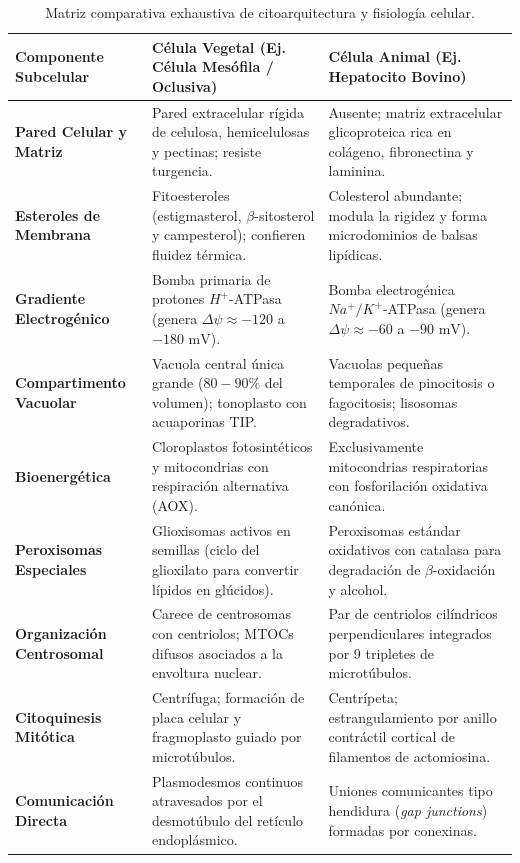 \documentclass[12pt,spanish,letterpaper,oneside]{article}
\begin{document}
\begin{table}[h!]
\centering
\footnotesize
\begin{tabularx}{\textwidth}{lYY}
\toprule
\textbf{Componente Subcelular} & \textbf{Célula Vegetal (Ej. Célula Mesófila / Oclusiva)} & \textbf{Célula Animal (Ej. Hepatocito Bovino)} \\
\midrule
\textbf{Pared Celular y Matriz} & Pared extracelular rígida de celulosa, hemicelulosas y pectinas; resiste turgencia. & Ausente; matriz extracelular glicoproteica rica en colágeno, fibronectina y laminina. \\
\textbf{Esteroles de Membrana} & Fitoesteroles (estigmasterol, $\beta$-sitosterol y campesterol); confieren fluidez térmica. & Colesterol abundante; modula la rigidez y forma microdominios de balsas lipídicas. \\
\textbf{Gradiente Electrogénico} & Bomba primaria de protones $H^+$-ATPasa (genera $\Delta\psi \approx -120$ a $-180\text{ mV}$). & Bomba electrogénica $Na^+/K^+$-ATPasa (genera $\Delta\psi \approx -60$ a $-90\text{ mV}$). \\
\textbf{Compartimento Vacuolar} & Vacuola central única grande ($80-90\%$ del volumen); tonoplasto con acuaporinas TIP. & Vacuolas pequeñas temporales de pinocitosis o fagocitosis; lisosomas degradativos. \\
\textbf{Bioenergética} & Cloroplastos fotosintéticos y mitocondrias con respiración alternativa (AOX). & Exclusivamente mitocondrias respiratorias con fosforilación oxidativa canónica. \\
\textbf{Peroxisomas Especiales} & Glioxisomas activos en semillas (ciclo del glioxilato para convertir lípidos en glúcidos). & Peroxisomas estándar oxidativos con catalasa para degradación de $\beta$-oxidación y alcohol. \\
\textbf{Organización Centrosomal} & Carece de centrosomas con centriolos; MTOCs difusos asociados a la envoltura nuclear. & Par de centriolos cilíndricos perpendiculares integrados por 9 tripletes de microtúbulos. \\
\textbf{Citoquinesis Mitótica} & Centrífuga; formación de placa celular y fragmoplasto guiado por microtúbulos. & Centrípeta; estrangulamiento por anillo contráctil cortical de filamentos de actomiosina. \\
\textbf{Comunicación Directa} & Plasmodesmos continuos atravesados por el desmotúbulo del retículo endoplásmico. & Uniones comunicantes tipo hendidura (\textit{gap junctions}) formadas por conexinas. \\
\bottomrule
\end{tabularx}
\caption{Matriz comparativa exhaustiva de citoarquitectura y fisiología celular.}
\end{table}
\end{document}
